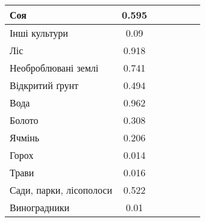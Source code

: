 \begin{table}[!ht]
\begin{tabular}{|K|S|C|C|S|C|C|}
        \hline Соя                           & 0.595                                     &                                           &              &  &         &              \\
        \hline Інші культури                 & 0.09                                      &                                           &              &  &         &              \\
        \hline Ліс                           & 0.918                                     &                                           &              &  &         &              \\
        \hline Необроблювані землі           & 0.741                                     &                                           &              &  &         &              \\
        \hline Відкритий ґрунт               & 0.494                                     &                                           &              &  &         &              \\
        \hline Вода                          & 0.962                                     &                                           &              &  &         &              \\
        \hline Болото                        & 0.308                                     &                                           &              &  &         &              \\
        \hline Ячмінь                        & 0.206                                     &                                           &              &  &         &              \\
        \hline Горох                         & 0.014                                     &                                           &              &  &         &              \\
        \hline Трави                         & 0.016                                     &                                           &              &  &         &              \\
        \hline Сади, парки, лісополоси       & 0.522                                     &                                           &              &  &         &              \\
        \hline Виноградники                  & 0.01                                      &                                           &              &  &         &              \\
        \hline
    \end{tabular}
    \label{tab:segm_result_augm_per_classes}
\end{table}


